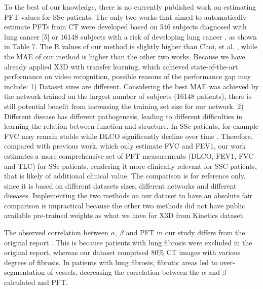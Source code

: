 To the best of our knowledge, there is no currently published work on estimating PFT values for SSc patients. The only two works \cite{Park2023, choi2022automated} that aimed to automatically estimate PFTs from CT were developed based on 546 subjects diagnosed with lung cancer [5] or 16148 subjects with a risk of developing lung cancer \cite{Park2023}, as shown in Table 7. The R values of our method is slightly higher than Choi, et al. \cite{choi2022automated}, while the MAE of our method is higher than the other two works. Because we have already applied X3D with transfer learning, which achieved state-of-the-art performance on video recognition, possible reasons of the performance gap may include: 1) Dataset sizes are different. Considering the best MAE was achieved by the network trained on the largest number of subjects (16148 patients), there is still potential benefit from increasing the training set size for our network. 2) Different disease has different pathogenesis, leading to different difficulties in learning the relation between function and structure. In SSc patients, for example FVC may remain stable while DLCO significantly decline over time \cite{LeGouellec2017}. Therefore, compared with previous work, which only estimate FVC and FEV1, our work estimates a more comprehensive set of PFT measurements (DLCO, FEV1, FVC and TLC) for SSc patients, rendering it more clinically relevant for SSC patients, that is likely of additional clinical value. The comparison is for reference only, since it is based on different datasets sizes, different networks and different diseases. Implementing the two methods on our dataset to have an absolute fair comparison is impractical because the other two methods did not have public available pre-trained weights as what we have for X3D from Kinetics dataset.

The observed correlation between $\alpha$, $\beta$ and PFT in our study differs from the original report \cite{Zhai2016}. This is because patients with lung fibrosis were excluded in the original report, whereas our dataset comprised 80\% CT images with various degrees of fibrosis. In patients with lung fibrosis, fibrotic areas led to over-segmentation of vessels, decreasing the correlation between the $\alpha$ and $\beta$ calculated and PFT.

